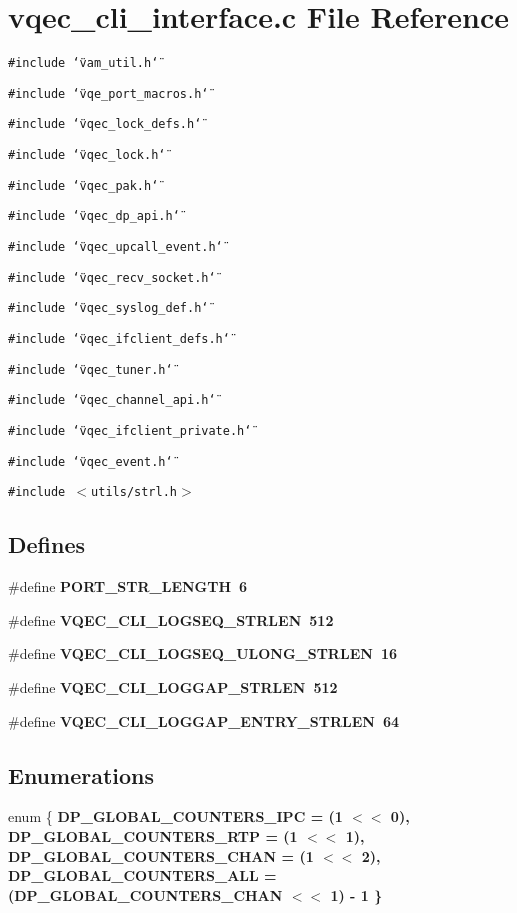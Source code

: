 \section{vqec\_\-cli\_\-interface.c File Reference}
\label{vqec__cli__interface_8c}
{\tt \#include \char`\"{}vam\_\-util.h\char`\"{}}\par
{\tt \#include \char`\"{}vqe\_\-port\_\-macros.h\char`\"{}}\par
{\tt \#include \char`\"{}vqec\_\-lock\_\-defs.h\char`\"{}}\par
{\tt \#include \char`\"{}vqec\_\-lock.h\char`\"{}}\par
{\tt \#include \char`\"{}vqec\_\-pak.h\char`\"{}}\par
{\tt \#include \char`\"{}vqec\_\-dp\_\-api.h\char`\"{}}\par
{\tt \#include \char`\"{}vqec\_\-upcall\_\-event.h\char`\"{}}\par
{\tt \#include \char`\"{}vqec\_\-recv\_\-socket.h\char`\"{}}\par
{\tt \#include \char`\"{}vqec\_\-syslog\_\-def.h\char`\"{}}\par
{\tt \#include \char`\"{}vqec\_\-ifclient\_\-defs.h\char`\"{}}\par
{\tt \#include \char`\"{}vqec\_\-tuner.h\char`\"{}}\par
{\tt \#include \char`\"{}vqec\_\-channel\_\-api.h\char`\"{}}\par
{\tt \#include \char`\"{}vqec\_\-ifclient\_\-private.h\char`\"{}}\par
{\tt \#include \char`\"{}vqec\_\-event.h\char`\"{}}\par
{\tt \#include $<$utils/strl.h$>$}\par
\subsection*{Defines}
\begin{CompactItemize}
\item 
\#define \bf{PORT\_\-STR\_\-LENGTH}~6
\item 
\#define \bf{VQEC\_\-CLI\_\-LOGSEQ\_\-STRLEN}~512
\item 
\#define \bf{VQEC\_\-CLI\_\-LOGSEQ\_\-ULONG\_\-STRLEN}~16
\item 
\#define \bf{VQEC\_\-CLI\_\-LOGGAP\_\-STRLEN}~512
\item 
\#define \bf{VQEC\_\-CLI\_\-LOGGAP\_\-ENTRY\_\-STRLEN}~64
\end{CompactItemize}
\subsection*{Enumerations}
\begin{CompactItemize}
\item 
enum \{ \bf{DP\_\-GLOBAL\_\-COUNTERS\_\-IPC} =  (1 $<$$<$ 0), 
\bf{DP\_\-GLOBAL\_\-COUNTERS\_\-RTP} =  (1 $<$$<$ 1), 
\bf{DP\_\-GLOBAL\_\-COUNTERS\_\-CHAN} =  (1 $<$$<$ 2), 
\bf{DP\_\-GLOBAL\_\-COUNTERS\_\-ALL} =  (DP\_\-GLOBAL\_\-COUNTERS\_\-CHAN $<$$<$ 1) - 1
 \}
\end{CompactItemize}
